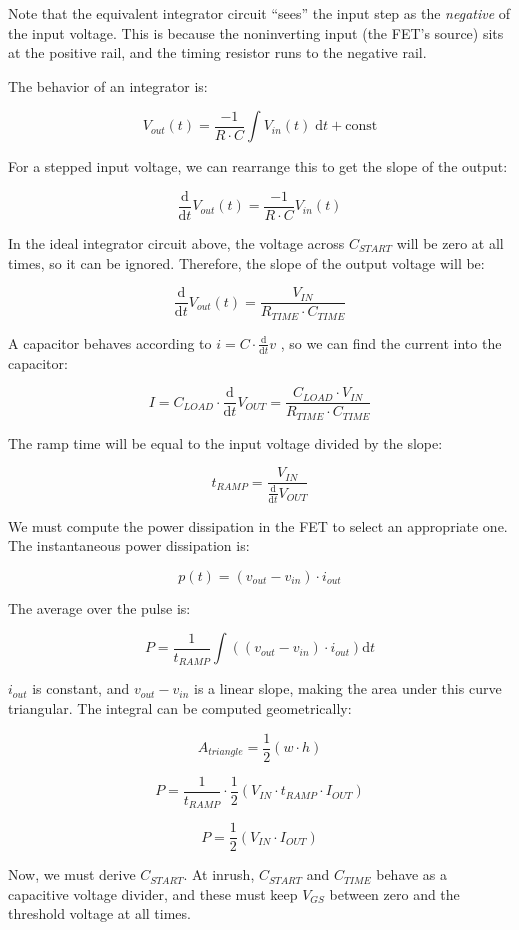 \documentclass[letterpaper,12pt]{article}
\newcommand{\ddt}{\ensuremath{\frac{\mathrm{d}}{\mathrm{d}t}}}
\newcommand{\dt}{\ensuremath{{\mathrm{d}t}}}
\begin{document}
Note that the equivalent integrator circuit ``sees'' the input step as the \emph{negative}
of the input voltage. This is because the noninverting input (the FET's source) sits at the
positive rail, and the timing resistor runs to the negative rail.

The behavior of an integrator is\cite[p. 230]{aoe}:

$$ V_{out}(t) = \frac{-1}{R\cdot C} \int V_{in}(t)\;\mathrm{d}t + \mathrm{const} $$

For a stepped input voltage, we can rearrange this to get the slope of the output:

$$ \ddt V_{out}(t) = \frac{-1}{R\cdot C} V_{in}(t) $$

In the ideal integrator circuit above, the voltage across $C_{START}$ will be zero at
all times, so it can be ignored. Therefore, the slope of the output voltage will be:

$$ \ddt V_{out}(t) = \frac{V_{IN}}{R_{TIME}\cdot C_{TIME}} $$

A capacitor behaves according to $i = C \cdot \ddt v$ \cite[p. 19]{aoe}, so we can find the
current into the capacitor:

$$ I = C_{LOAD} \cdot \ddt V_{OUT} = \frac{C_{LOAD}\cdot V_{IN}}{R_{TIME}\cdot C_{TIME}} $$

The ramp time will be equal to the input voltage divided by the slope:

$$ t_{RAMP} = \frac{V_{IN}}{\ddt V_{OUT}} $$

We must compute the power dissipation in the FET to select an appropriate one. The instantaneous
power dissipation is:

$$ p(t) = (v_{out} - v_{in})\cdot i_{out} $$

The average over the pulse is:

$$ P = \frac{1}{t_{RAMP}} \int \left( (v_{out} - v_{in}) \cdot i_{out} \right) \dt $$

$i_{out}$ is constant, and $v_{out} - v_{in}$ is a linear slope, making the area under this curve
triangular. The integral can be computed geometrically:

$$ A_{triangle} = \frac{1}{2} (w \cdot h) $$

$$ P = \frac{1}{t_{RAMP}} \cdot \frac{1}{2} \left( V_{IN} \cdot t_{RAMP} \cdot I_{OUT} \right) $$

$$ P = \frac{1}{2} \left( V_{IN} \cdot I_{OUT} \right) $$

Now, we must derive $C_{START}$. At inrush, $C_{START}$ and $C_{TIME}$ behave as a capacitive
voltage divider, and these must keep $V_{GS}$ between zero and the threshold voltage at all
times.
\end{document}
